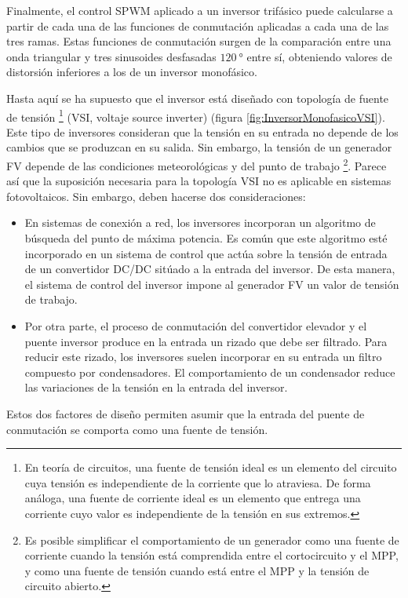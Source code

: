 Finalmente, el control SPWM aplicado a un inversor trifásico puede
calcularse a partir de cada una de las funciones de conmutación aplicadas
a cada una de las tres ramas. Estas funciones de conmutación surgen
de la comparación entre una onda triangular y tres sinusoides desfasadas
$\SI{120}{\degree}$ entre sí, obteniendo valores de distorsión inferiores
a los de un inversor monofásico. 

Hasta aquí se ha supuesto que el inversor está diseñado con topología
de fuente de tensión%
\footnote{En teoría de circuitos, una fuente de tensión ideal es un elemento
del circuito cuya tensión es independiente de la corriente que lo
atraviesa. De forma análoga, una fuente de corriente ideal es un elemento
que entrega una corriente cuyo valor es independiente de la tensión
en sus extremos.%
} (VSI, voltaje source inverter) (figura \ref{fig:InversorMonofasicoVSI}).
Este tipo de inversores consideran que la tensión en su entrada no
depende de los cambios que se produzcan en su salida. Sin embargo,
la tensión de un generador FV depende de las condiciones meteorológicas
y del punto de trabajo%
\footnote{Es posible simplificar el comportamiento de un generador como una
fuente de corriente cuando la tensión está comprendida entre el cortocircuito
y el MPP, y como una fuente de tensión cuando está entre el MPP y
la tensión de circuito abierto.%
}. Parece así que la suposición necesaria para la topología VSI no
es aplicable en sistemas fotovoltaicos. Sin embargo, deben hacerse
dos consideraciones:
\begin{itemize}
\item En sistemas de conexión a red, los inversores incorporan un algoritmo
de búsqueda del punto de máxima potencia. Es común que este algoritmo
esté incorporado en un sistema de control que actúa sobre la tensión
de entrada de un convertidor DC/DC sitúado a la entrada del inversor.
De esta manera, el sistema de control del inversor impone al generador
FV un valor de tensión de trabajo. 
\item Por otra parte, el proceso de conmutación del convertidor elevador
y el puente inversor produce en la entrada un rizado que debe ser
filtrado. Para reducir este rizado, los inversores suelen incorporar
en su entrada un filtro compuesto por condensadores. El comportamiento
de un condensador reduce las variaciones de la tensión en la entrada
del inversor.
\end{itemize}
Estos dos factores de diseño permiten asumir que la entrada del puente
de conmutación se comporta como una fuente de tensión. 

